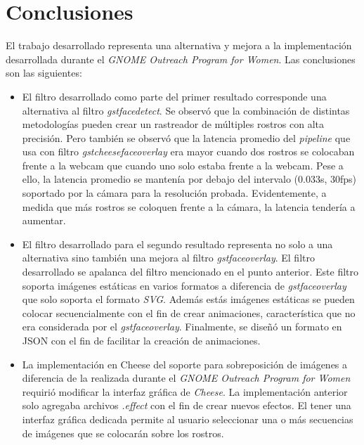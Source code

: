 \documentclass[a4paper,openright,12pt]{report}
\begin{document}
\section{Conclusiones}
  El trabajo desarrollado representa una alternativa y mejora a la
  implementación desarrollada durante el \textit{GNOME Outreach Program for
  Women}. Las conclusiones son las siguientes:\\

  \begin{itemize}
    \item
      El filtro desarrollado como parte del primer resultado corresponde
      una alternativa al filtro \textit{gstfacedetect}. Se observó que la
      combinación de distintas metodologías pueden crear un rastreador de
      múltiples rostros con alta precisión. Pero también se observó que
      la latencia promedio del \textit{pipeline} que usa con filtro
      \textit{gstcheesefaceoverlay} era mayor cuando dos rostros se colocaban
      frente a la webcam que cuando uno solo estaba frente a la webcam. Pese a
      ello, la latencia promedio se mantenía por debajo del intervalo
      (0.033s, 30fps) soportado por la cámara para la resolución probada.
      Evidentemente, a medida que más rostros se coloquen frente a la cámara, la
      latencia tendería a aumentar.
    \item
      El filtro desarrollado para el segundo resultado representa no solo a una
      alternativa sino también una mejora al filtro \textit{gstfaceoverlay}. El
      filtro desarrollado se apalanca del filtro mencionado en el punto
      anterior. Este filtro soporta imágenes estáticas en varios formatos a
      diferencia de \textit{gstfaceoverlay} que solo soporta el formato
      \textit{SVG}. Además estás imágenes estáticas se pueden colocar
      secuencialmente con el fin de crear animaciones, característica
      que no era considerada por el \textit{gstfaceoverlay}. Finalmente,
      se diseñó un formato en JSON con el fin de facilitar la creación de
      animaciones.
  \end{itemize}
  \clearpage
  \begin{itemize}
    \item
      La implementación en Cheese del soporte para sobreposición de imágenes
      a diferencia de la realizada durante el \textit{GNOME Outreach Program
      for Women} requirió modificar la interfaz gráfica de \textit{Cheese}. La
      implementación anterior solo agregaba archivos \textit{.effect} con el fin
      de crear nuevos efectos. El tener una interfaz gráfica dedicada permite
      al usuario seleccionar una o más secuencias de imágenes que se colocarán
      sobre los rostros.
  \end{itemize}
\end{document}

